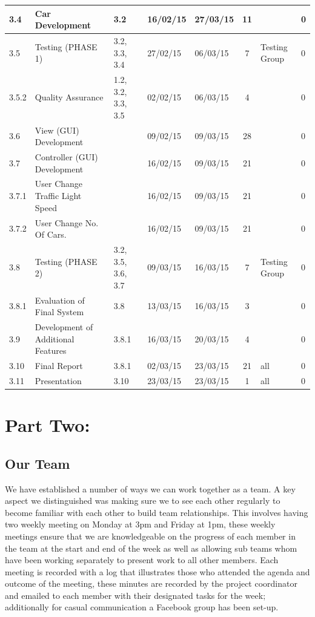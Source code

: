 \documentclass[a4paper,11pt]{article}
\begin{document}
\begin{table}[ht]
\begin{adjustwidth}{-2cm}{}
\begin{tabular}{|m{0.8cm}|m{6cm}|m{2.3cm}|m{1.3cm}|m{1.3cm}|c|m{2.6cm}|m{0.5cm}|}
			3.4 & Car Development & 3.2 & 16/02/15 & 27/03/15 & 11 &  & 0 \\\hline 
			3.5 & Testing (PHASE 1) & 3.2, 3.3, 3.4 & 27/02/15 & 06/03/15 & 7 & Testing Group & 0 \\\hline 
			3.5.2 & Quality Assurance  & 1.2, 3.2, 3.3, 3.5 & 02/02/15 & 06/03/15 & 4 &  & 0 \\\hline 
			3.6 & View (GUI) Development &  & 09/02/15 & 09/03/15 & 28 &  & 0 \\\hline 
			3.7 & Controller (GUI) Development  &  & 16/02/15 & 09/03/15 & 21 &  & 0 \\\hline 
			3.7.1 & User Change Traffic Light Speed  &  & 16/02/15 & 09/03/15 & 21 &  & 0 \\\hline 
			3.7.2 & User Change No. Of Cars.  &  & 16/02/15 & 09/03/15 & 21 &  & 0 \\\hline 
			3.8 & Testing (PHASE 2)  & 3.2, 3.5, 3.6, 3.7 & 09/03/15 & 16/03/15 & 7 & Testing Group & 0 \\\hline 
			3.8.1 & Evaluation of Final System  & 3.8 & 13/03/15 & 16/03/15 & 3 &  & 0 \\\hline 
			3.9 & Development of Additional Features & 3.8.1 & 16/03/15 & 20/03/15 & 4 &  & 0 \\\hline 
			3.10 & Final Report & 3.8.1 & 02/03/15 & 23/03/15 & 21 & all & 0 \\\hline 
			3.11 & Presentation & 3.10 & 23/03/15 & 23/03/15 & 1 & all & 0 \\ \hline 
		\end{tabular}
			\label{table:plan}
	\end{adjustwidth}
\end{table}

\section[short]{Part Two:}
\subsection{Our Team}%
We have established a number of ways we can work together as a team. A key aspect we distinguished was making sure we to see each other regularly to become familiar with each other to build team relationships. This involves having two weekly meeting on Monday at 3pm and Friday at 1pm, these weekly meetings ensure that we are knowledgeable on the progress of each member in the team at the start and end of the week as well as allowing sub teams whom have been working separately to present work to all other members. Each meeting is recorded with a log that illustrates those who attended the agenda and outcome of the meeting, these minutes are recorded by the project coordinator and emailed to each member with their designated tasks for the week; additionally for casual communication a Facebook group has been set-up.
\end{document}
